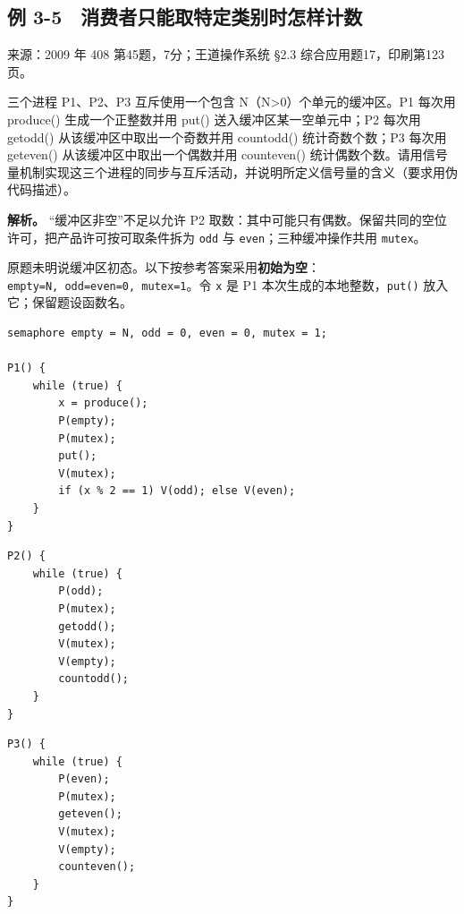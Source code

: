 \subsection{例 3-5　消费者只能取特定类别时怎样计数}\label{ex-2009}

来源：2009 年 408 第45题，7分；王道操作系统 §2.3 综合应用题17，印刷第123页。

三个进程 P1、P2、P3 互斥使用一个包含 N（N\textgreater0）个单元的缓冲区。P1 每次用 produce() 生成一个正整数并用 put() 送入缓冲区某一空单元中；P2 每次用 getodd() 从该缓冲区中取出一个奇数并用 countodd() 统计奇数个数；P3 每次用 geteven() 从该缓冲区中取出一个偶数并用 counteven() 统计偶数个数。请用信号量机制实现这三个进程的同步与互斥活动，并说明所定义信号量的含义（要求用伪代码描述）。


\textbf{解析。} ``缓冲区非空''不足以允许 P2 取数：其中可能只有偶数。保留共同的空位许可，把产品许可按可取条件拆为 \texttt{odd} 与 \texttt{even}；三种缓冲操作共用 \texttt{mutex}。

原题未明说缓冲区初态。以下按参考答案采用\textbf{初始为空}：\texttt{empty=N,\ odd=even=0,\ mutex=1}。令 \texttt{x} 是 P1 本次生成的本地整数，\texttt{put()} 放入它；保留题设函数名。

\par\medskip\noindent\begin{minipage}{\linewidth}
\begin{verbatim}
semaphore empty = N, odd = 0, even = 0, mutex = 1;

P1() {
    while (true) {
        x = produce();
        P(empty);
        P(mutex);
        put();
        V(mutex);
        if (x % 2 == 1) V(odd); else V(even);
    }
}
\end{verbatim}
\end{minipage}\par\medskip

\par\medskip\noindent\begin{minipage}{\linewidth}
\begin{verbatim}
P2() {
    while (true) {
        P(odd);
        P(mutex);
        getodd();
        V(mutex);
        V(empty);
        countodd();
    }
}
\end{verbatim}
\end{minipage}\par\medskip

\par\medskip\noindent\begin{minipage}{\linewidth}
\begin{verbatim}
P3() {
    while (true) {
        P(even);
        P(mutex);
        geteven();
        V(mutex);
        V(empty);
        counteven();
    }
}
\end{verbatim}
\end{minipage}\par\medskip

